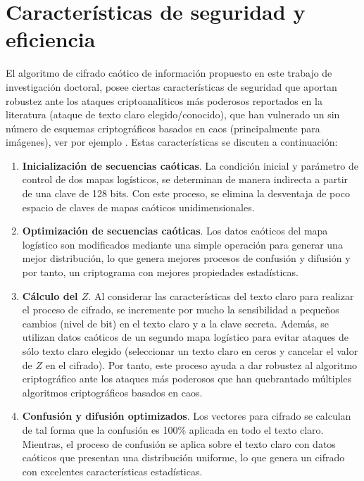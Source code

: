 \section{Características de seguridad y eficiencia}
El algoritmo de cifrado caótico de información propuesto en este trabajo de investigación doctoral, posee ciertas características de seguridad que aportan robustez ante los ataques criptoanalíticos más poderosos reportados en la literatura (ataque de texto claro elegido/conocido), que han vulnerado un sin número de esquemas criptográficos basados en caos (principalmente para imágenes), ver por ejemplo \cite{WEtAl_2005, WEtAl_2007, ByN_2008, CyS_2009, AyL_2009, LEtAl_2009, REtAl_2010, SEtAl_2010, LEtAl_2011, ZEtAl_2011, LEtAl_2012}. Estas características se discuten a continuación: \\
\begin{enumerate}
\item \textbf{Inicialización de secuencias caóticas}. La condición inicial y parámetro de control de dos mapas logísticos, se determinan de manera indirecta a partir de una clave de 128 bits. Con este proceso, se elimina la desventaja de poco espacio de claves de mapas caóticos unidimensionales. 
\item \textbf{Optimización de secuencias caóticas}. Los datos caóticos del mapa logístico son modificados mediante una simple operación para generar una mejor distribución, lo que genera mejores procesos de confusión y difusión y por tanto, un criptograma con mejores propiedades estadísticas.
\item \textbf{Cálculo del $Z$}. Al considerar las características del texto claro para realizar el proceso de cifrado, se incremente por mucho la sensibilidad a pequeños cambios (nivel de bit) en el texto claro y a la clave secreta. Además, se utilizan datos caóticos de un segundo mapa logístico para evitar ataques de sólo texto claro elegido (seleccionar un texto claro en ceros y cancelar el valor de $Z$ en el cifrado). Por tanto, este proceso ayuda a dar robustez al algoritmo criptográfico ante los ataques más poderosos que han quebrantado múltiples algoritmos criptográficos basados en caos. 
\item \textbf{Confusión y difusión optimizados}. Los vectores para cifrado se calculan de tal forma que la confusión es 100\% aplicada en todo el texto claro. Mientras, el proceso de confusión se aplica sobre el texto claro con datos caóticos que presentan una distribución uniforme, lo que genera un cifrado con excelentes características estadísticas.      

\end{enumerate}
